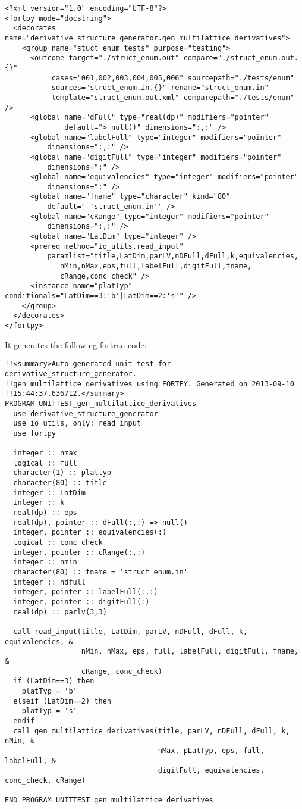 \documentclass[paper=a4, fontsize=11pt]{scrartcl} %
\numberwithin{equation}{section} %
\numberwithin{figure}{section} %
\numberwithin{table}{section} %
\begin{document}
\begin{lstlisting}
<?xml version="1.0" encoding="UTF-8"?>
<fortpy mode="docstring">
  <decorates name="derivative_structure_generator.gen_multilattice_derivatives">
    <group name="stuct_enum_tests" purpose="testing">
      <outcome target="./struct_enum.out" compare="./struct_enum.out.{}" 
	       cases="001,002,003,004,005,006" sourcepath="./tests/enum" 
	       sources="struct_enum.in.{}" rename="struct_enum.in" 
	       template="struct_enum.out.xml" comparepath="./tests/enum" />
      <global name="dFull" type="real(dp)" modifiers="pointer" 
              default="> null()" dimensions=":,:" />
      <global name="labelFull" type="integer" modifiers="pointer" 
	      dimensions=":,:" />
      <global name="digitFull" type="integer" modifiers="pointer" 
	      dimensions=":" />
      <global name="equivalencies" type="integer" modifiers="pointer" 
	      dimensions=":" />
      <global name="fname" type="character" kind="80" 
	      default=" 'struct_enum.in'" />
      <global name="cRange" type="integer" modifiers="pointer" 
	      dimensions=":,:" />
      <global name="LatDim" type="integer" />
      <prereq method="io_utils.read_input" 
	      paramlist="title,LatDim,parLV,nDFull,dFull,k,equivalencies,
			 nMin,nMax,eps,full,labelFull,digitFull,fname,
			 cRange,conc_check" />
      <instance name="platTyp" conditionals="LatDim==3:'b'|LatDim==2:'s'" />
    </group>
  </decorates>
</fortpy>
\end{lstlisting}

It generates the following fortran code:

\lstset{language=[90]Fortran}
\begin{lstlisting}
!!<summary>Auto-generated unit test for derivative_structure_generator.
!!gen_multilattice_derivatives using FORTPY. Generated on 2013-09-10 
!!15:44:37.636712.</summary>
PROGRAM UNITTEST_gen_multilattice_derivatives
  use derivative_structure_generator
  use io_utils, only: read_input
  use fortpy

  integer :: nmax
  logical :: full
  character(1) :: plattyp
  character(80) :: title
  integer :: LatDim
  integer :: k
  real(dp) :: eps
  real(dp), pointer :: dFull(:,:) => null()
  integer, pointer :: equivalencies(:)
  logical :: conc_check
  integer, pointer :: cRange(:,:)
  integer :: nmin
  character(80) :: fname = 'struct_enum.in'
  integer :: ndfull
  integer, pointer :: labelFull(:,:)
  integer, pointer :: digitFull(:)
  real(dp) :: parlv(3,3)

  call read_input(title, LatDim, parLV, nDFull, dFull, k, equivalencies, &
                  nMin, nMax, eps, full, labelFull, digitFull, fname, &
                  cRange, conc_check)
  if (LatDim==3) then
    platTyp = 'b'
  elseif (LatDim==2) then
    platTyp = 's'
  endif
  call gen_multilattice_derivatives(title, parLV, nDFull, dFull, k, nMin, &
                                    nMax, pLatTyp, eps, full, labelFull, &
                                    digitFull, equivalencies, conc_check, cRange)
  
END PROGRAM UNITTEST_gen_multilattice_derivatives
\end{lstlisting}
\end{document}

